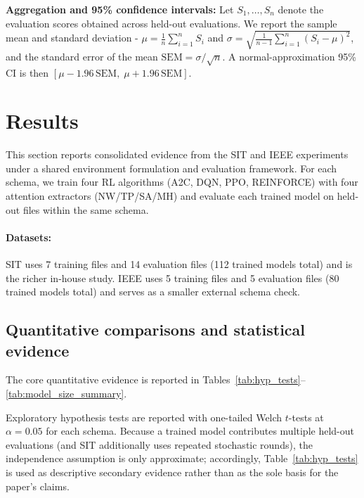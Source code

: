 \documentclass[sn-basic]{sn-jnl} %
\begin{document}
\textbf{Aggregation and 95\% confidence intervals:}
Let $S_1,\ldots,S_n$ denote the evaluation scores obtained across held-out evaluations. We report the sample mean and standard deviation - 
 $\mu = \frac{1}{n}\sum_{i=1}^{n} S_i$ and $\sigma = \sqrt{\frac{1}{n-1}\sum_{i=1}^{n}(S_i-\mu)^2}$,
and the standard error of the mean $\mathrm{SEM}=\sigma/\sqrt{n}$. A normal-approximation 95\% CI is then $[\mu-1.96\,\mathrm{SEM},\;\mu+1.96\,\mathrm{SEM}]$.

\section{Results} \label{sec:results}
This section reports consolidated evidence from the SIT and IEEE experiments under a shared environment formulation and evaluation framework. For each schema, we train four RL algorithms (\textsc{A2C}, \textsc{DQN}, \textsc{PPO}, \textsc{REINFORCE}) with four attention extractors (NW/TP/SA/MH) and evaluate each trained model on held-out files within the same schema.

\paragraph{Datasets:}
SIT uses 7 training files and 14 evaluation files (112 trained models total) and is the richer in-house study. IEEE uses 5 training files and 5 evaluation files (80 trained models total) and serves as a smaller external schema check.

\subsection{Quantitative comparisons and statistical evidence}
\label{sec:hypothesis_tests}

The core quantitative evidence is reported in Tables~\ref{tab:hyp_tests}--\ref{tab:model_size_summary}.

Exploratory hypothesis tests are reported with one-tailed Welch $t$-tests at $\alpha=0.05$ for each schema. Because a trained model contributes multiple held-out evaluations (and SIT additionally uses repeated stochastic rounds), the independence assumption is only approximate; accordingly, Table~\ref{tab:hyp_tests} is used as descriptive secondary evidence rather than as the sole basis for the paper's claims.
\end{document}
